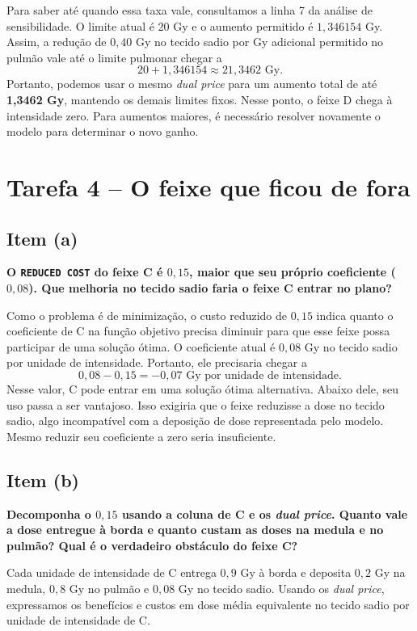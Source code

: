 \documentclass[12pt,a4paper]{article}
\begin{document}
Para saber até quando essa taxa vale, consultamos a linha 7 da análise
 de sensibilidade. O limite atual é 20 Gy e o aumento permitido é
 $1{,}346154$ Gy. Assim, a redução de $0{,}40$ Gy no tecido sadio por Gy
 adicional permitido no pulmão vale até o limite pulmonar chegar a
\[
20+1{,}346154\approx\boxed{21{,}3462\text{ Gy}}.
\]
Portanto, podemos usar o mesmo \textit{dual price} para um aumento total de até
\textbf{1,3462 Gy}, mantendo os demais limites fixos. Nesse ponto, o
feixe D chega à intensidade zero. Para aumentos maiores, é necessário
resolver novamente o modelo para determinar o novo ganho.

\clearpage
\section*{Tarefa 4 -- O feixe que ficou de fora}

\subsection*{Item (a)}

\textbf{O \texttt{REDUCED COST} do feixe C é $0{,}15$, maior que seu
próprio coeficiente ($0{,}08$). Que melhoria no tecido sadio faria
o feixe C entrar no plano?}

Como o problema é de minimização, o custo reduzido de $0{,}15$ indica
quanto o coeficiente de C na função objetivo precisa diminuir para
que esse feixe possa participar de uma solução ótima. O coeficiente
atual é $0{,}08$ Gy no tecido sadio por unidade de intensidade.
Portanto, ele precisaria chegar a
\[
0{,}08-0{,}15=\boxed{-0{,}07\text{ Gy por unidade de intensidade}}.
\]
Nesse valor, C pode entrar em uma solução ótima alternativa. Abaixo
dele, seu uso passa a ser vantajoso. Isso exigiria que o feixe reduzisse
a dose no tecido sadio, algo incompatível com a deposição de dose
representada pelo modelo. Mesmo reduzir seu coeficiente a zero
seria insuficiente.

\subsection*{Item (b)}

\textbf{Decomponha o $0{,}15$ usando a coluna de C e os \textit{dual price}.
Quanto vale a dose entregue à borda e quanto custam as doses na
medula e no pulmão? Qual é o verdadeiro obstáculo do feixe C?}

Cada unidade de intensidade de C entrega $0{,}9$ Gy à borda e deposita
$0{,}2$ Gy na medula, $0{,}8$ Gy no pulmão e $0{,}08$ Gy no tecido
sadio. Usando os \textit{dual price}, expressamos os benefícios e custos
em dose média equivalente no tecido sadio por unidade de intensidade de C.
\end{document}
